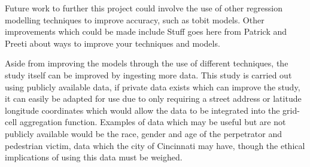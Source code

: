 \documentclass{llncs}
\begin{document}
Future work to further this project could involve the use of other regression modelling techniques to improve accuracy, such as tobit models. Other improvements which could be made include Stuff goes here from Patrick and Preeti about ways to improve your techniques and models.

Aside from improving the models through the use of different techniques, the study itself can be improved by ingesting more data. This study is carried out using publicly available data, if private data exists which can improve the study, it can easily be adapted for use due to only requiring a street address or latitude longitude coordinates which would allow the data to be integrated into the grid-cell aggregation function. Examples of data which may be useful but are not publicly available would be the race, gender and age of the perpetrator and pedestrian victim, data which the city of Cincinnati may have, though the ethical implications of using this data must be weighed.


%


\end{document}
